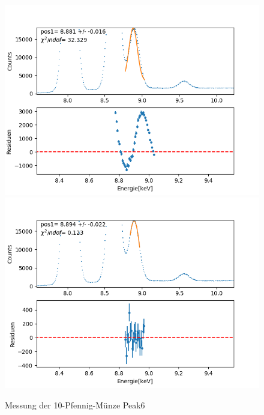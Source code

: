 \documentclass[12pt,a4paper]{article}
\begin{document}
\begin{figure}[H]
\centering
\includegraphics[scale=0.49]{Bilder/roentgen_spektren/pfennig/pfen6_1.png}
\includegraphics[scale=0.49]{Bilder/roentgen_spektren/pfennig/pfen6_2.png}
\caption{Messung der 10-Pfennig-Münze Peak6}
\end{figure}
\end{document}
